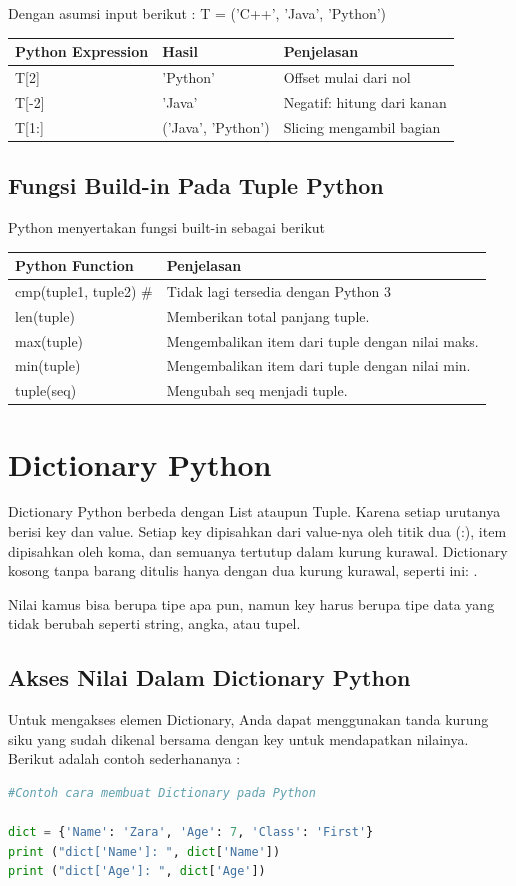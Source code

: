 Dengan asumsi input berikut : T = ('C++', 'Java', 'Python')
\begin{center}
\begin{tabular}{ | m{4cm} | m{4cm} | m{2cm} | }
\hline
Python Expression & Hasil & Penjelasan \\
\hline
T[2] & 'Python' & Offset mulai dari nol \\
\hline
T[-2] & 'Java' & Negatif: hitung dari kanan \\
\hline
T[1:] & ('Java', 'Python') & Slicing mengambil bagian \\
\hline
\end{tabular}
\end{center}

\subsection{Fungsi Build-in Pada Tuple Python}
Python menyertakan fungsi built-in sebagai berikut
\begin{center}
\begin{tabular}{ | m{4cm} | m{4cm} | }
\hline
Python Function & Penjelasan \\
\hline
cmp(tuple1, tuple2)	\# & Tidak lagi tersedia dengan Python 3 \\
\hline
len(tuple) & Memberikan total panjang tuple. \\
\hline
max(tuple) & Mengembalikan item dari tuple dengan nilai maks. \\
\hline
min(tuple) & Mengembalikan item dari tuple dengan nilai min. \\
\hline
tuple(seq) & Mengubah seq menjadi tuple. \\
\hline
\end{tabular}
\end{center}

\section{Dictionary Python}
Dictionary Python berbeda dengan List ataupun Tuple. Karena setiap urutanya berisi key dan value. Setiap key dipisahkan dari value-nya oleh titik dua (:), item dipisahkan oleh koma, dan semuanya tertutup dalam kurung kurawal. Dictionary kosong tanpa barang ditulis hanya dengan dua kurung kurawal, seperti ini: {}.

Nilai kamus bisa berupa tipe apa pun, namun key harus berupa tipe data yang tidak berubah seperti string, angka, atau tupel.

\subsection{Akses Nilai Dalam Dictionary Python}
Untuk mengakses elemen Dictionary, Anda dapat menggunakan tanda kurung siku yang sudah dikenal bersama dengan key untuk mendapatkan nilainya. Berikut adalah contoh sederhananya :
\begin{lstlisting}[language=Python]
#Contoh cara membuat Dictionary pada Python

dict = {'Name': 'Zara', 'Age': 7, 'Class': 'First'}
print ("dict['Name']: ", dict['Name'])
print ("dict['Age']: ", dict['Age'])
\end{lstlisting}

